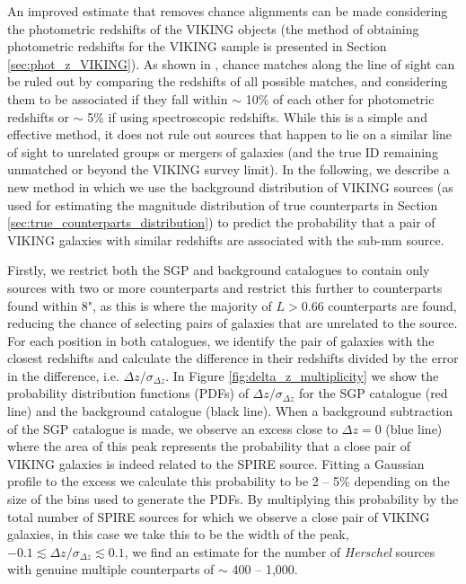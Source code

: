An improved estimate that removes chance alignments can be made considering the photometric redshifts of the VIKING objects (the method of obtaining photometric redshifts for the VIKING sample is presented in Section \ref{sec:phot_z_VIKING}). As shown in \citealt{Fleuren_2012}, chance matches along the line of sight can be ruled out by comparing the redshifts of all possible matches, and considering them to be associated if they fall within $\sim$ 10\% of each other for photometric redshifts or $\sim$ 5\% if using spectroscopic redshifts. While this is a simple and effective method, it does not rule out sources that happen to lie on a similar line of sight to unrelated groups or mergers of galaxies (and the true ID remaining unmatched or beyond the VIKING survey limit). In the following, we describe a new method in which we use the background distribution of VIKING sources (as used for estimating the magnitude distribution of true counterparts in Section \ref{sec:true_counterparts_distribution}) to predict the probability that a pair of VIKING galaxies with similar redshifts are associated with the sub-mm source. 

Firstly, we restrict both the SGP and background catalogues to contain only sources with two or more counterparts and restrict this further to counterparts found within 8", as this is where the majority of $L > 0.66$ counterparts are found, reducing the chance of selecting pairs of galaxies that are unrelated to the source. For each position in both catalogues, we identify the pair of galaxies with the closest redshifts and calculate the difference in their redshifts divided by the error in the difference, i.e. $\Delta z/\sigma_{\Delta z}$. In Figure \ref{fig:delta_z_multiplicity} we show the probability distribution functions (PDFs) of $\Delta z/\sigma_{\Delta z}$ for the SGP catalogue (red line) and the background catalogue (black line). When a background subtraction of the SGP catalogue is made, we observe an excess close to $\Delta z = 0$ (blue line) where the area of this peak represents the probability that a close pair of VIKING galaxies is indeed related to the SPIRE source. Fitting a Gaussian profile to the excess we calculate this probability to be 2 -- 5\% depending on the size of the bins used to generate the PDFs. By multiplying this probability by the total number of SPIRE sources for which we observe a close pair of VIKING galaxies, in this case we take this to be the width of the peak, $-0.1 \lesssim \Delta z/\sigma_{\Delta z} \lesssim 0.1$, we find an estimate for the number of \textit{Herschel} sources with genuine multiple counterparts of $\sim$ 400 -- 1,000.

